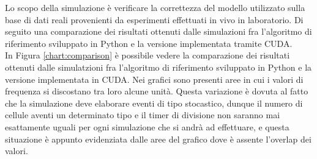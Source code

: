 Lo scopo della simulazione è verificare la correttezza del modello utilizzato
sulla base di dati reali provenienti da esperimenti effettuati in vivo
in laboratorio.
Di seguito una comparazione dei risultati ottenuti dalle simulazioni fra
l'algoritmo di riferimento sviluppato in Python e la versione implementata
tramite CUDA.
\\
In Figura \ref{chart:comparison} è possibile vedere la comparazione dei
risultati ottenuti dalle simulatzioni fra l'algoritmo di riferimento sviluppato
in Python e la versione implementata in CUDA.
Nei grafici sono presenti aree in cui
i valori di frequenza si discostano tra loro alcune unità. Questa variazione
è dovuta al fatto che la simulazione deve elaborare eventi di tipo stocastico,
dunque il numero di cellule aventi un determinato tipo e il timer di divisione
non saranno mai esattamente uguali per ogni simulazione che si andrà ad
effettuare, e questa situazione è appunto evidenziata dalle aree del grafico
dove è assente l'overlap dei valori. 
